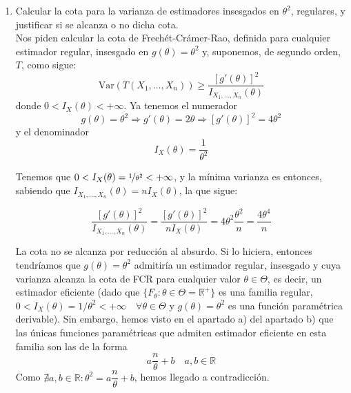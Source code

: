 \documentclass[12pt]{article}
\newcommand{\V}{\mathrm{Var}}
\newcommand{\R}{\mathbb{R}}
\newcommand{\Rmas}{\R^{+}}
\begin{document}
\begin{ejercicio}
\begin{enumerate}[label=\alph*)]
\begin{enumerate}[label=\alph*)]
                    \newpage

                    \item Calcular la cota para la varianza de estimadores insesgados en $\theta^2$, regulares, y justificar si se alcanza o no dicha cota. \\
                    
                    Nos piden calcular la cota de Frechét-Crámer-Rao, definida para cualquier estimador regular, insesgado en $g(\theta) = \theta^2$ y, suponemos, de segundo orden, $T$, como sigue:
                    $$\V(T(X_1, \ldots, X_n)) \geq \dfrac{[g'(\theta)]^2}{I_{X_1, \ldots, X_n}(\theta)}$$
                    donde $0 < I_X(\theta) < + \infty$. Ya tenemos el numerador 
                    $$g(\theta) = \theta^2 \Longrightarrow g'(\theta) = 2 \theta \Longrightarrow [g'(\theta)]^2 = 4 \theta^2$$
                    y el denominador $$I_X(\theta) = \dfrac{1}{\theta^2}$$

                    Tenemos que $0 < I_X(\theta) = \nicefrac{1}{\theta^2} < + \infty$, y la mínima varianza es entonces, sabiendo que $I_{X_1, \ldots, X_n}(\theta) = n I_X(\theta)$, la que sigue:

                    $$\dfrac{[g'(\theta)]^2}{I_{X_1, \ldots, X_n}(\theta)} = \dfrac{[g'(\theta)]^2}{n I_{X}(\theta)} = 4 \theta^2 \dfrac{\theta^2}{n} = \dfrac{4 \theta^4}{n}$$

                    La cota no se alcanza por reducción al absurdo. Si lo hiciera, entonces tendríamos que 
                    $g (\theta) = \theta^2$ admitiría un estimador regular, insesgado y cuya varianza alcanza 
                    la cota de FCR para cualquier valor $\theta \in \Theta$, es decir, un estimador eficiente 
                    (dado que $\{F_\theta : \theta \in \Theta = \Rmas\}$ es una familia regular, 
                    $0 < I_X(\theta) = 1/\theta^2 < + \infty \quad \forall \theta \in \Theta$ y 
                    $g(\theta) = \theta^2$ es una función paramétrica derivable). Sin embargo, 
                    hemos visto en el apartado a) del apartado b) que las únicas funciones paramétricas que admiten estimador eficiente en esta familia son las 
                    de la forma $$a \dfrac{n}{\theta} + b \quad a, b \in \R$$
                    Como $\nexists a,b \in \R : \theta^2 = a \dfrac{n}{\theta} + b$, hemos llegado a contradicción.

                \end{enumerate}
        \end{enumerate}
    \end{ejercicio}
\end{document}
